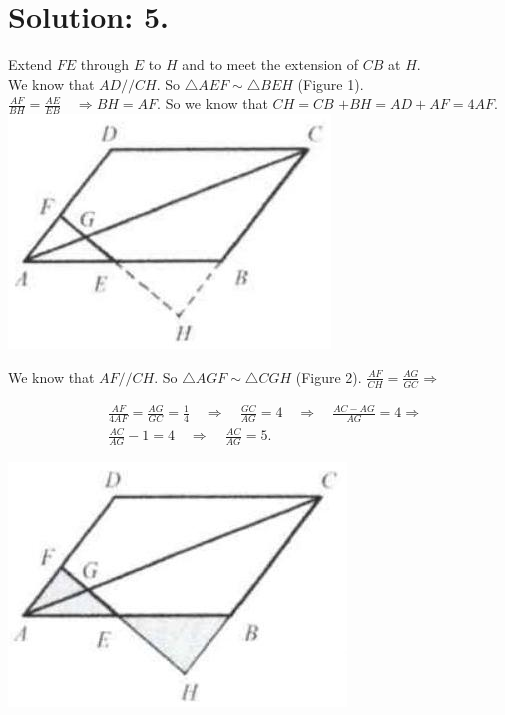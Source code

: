 \documentclass[10pt]{article}
\begin{document}
\section*{Solution: 5.}
Extend \(F E\) through \(E\) to \(H\) and to meet the extension of \(C B\) at \(H\).\\
We know that \(A D / / C H\). So \(\triangle A E F \sim \triangle B E H\) (Figure 1). \(\frac{A F}{B H}=\frac{A E}{E B} \quad \Rightarrow B H=A F\). So we know that \(C H=C B\) \(+B H=A D+A F=4 A F\).\\
\includegraphics[max width=\textwidth, center]{2025_04_17_97bc1f7e44d93c271a88g-123(1)}

We know that \(A F / / C H\). So \(\triangle A G F \sim \triangle C G H\) (Figure 2). \(\frac{A F}{C H}=\frac{A G}{G C} \Rightarrow\)

\[
\begin{aligned}
& \frac{A F}{4 A F}=\frac{A G}{G C}=\frac{1}{4} \quad \Rightarrow \quad \frac{G C}{A G}=4 \quad \Rightarrow \quad \frac{A C-A G}{A G}=4 \Rightarrow \\
& \frac{A C}{A G}-1=4 \quad \Rightarrow \quad \frac{A C}{A G}=5 .
\end{aligned}
\]

\begin{center}
\includegraphics[max width=\textwidth]{2025_04_17_97bc1f7e44d93c271a88g-124}
\end{center}
\end{document}
